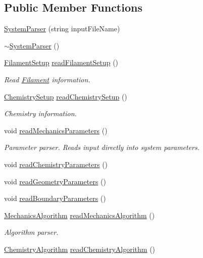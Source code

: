 \subsection*{Public Member Functions}
\begin{DoxyCompactItemize}
\item 
\hyperlink{classSystemParser_a47fe3046a8f228b77f06e84c56cccb39}{System\+Parser} (string input\+File\+Name)
\item 
\hyperlink{classSystemParser_a4603ce762d5b206694d97bb6c38f83ea}{$\sim$\+System\+Parser} ()
\item 
\hyperlink{structFilamentSetup}{Filament\+Setup} \hyperlink{classSystemParser_a2dac7ad3e016ee4ce9b93660c5192b2b}{read\+Filament\+Setup} ()
\begin{DoxyCompactList}\small\item\em Read \hyperlink{classFilament}{Filament} information. \end{DoxyCompactList}\item 
\hyperlink{structChemistrySetup}{Chemistry\+Setup} \hyperlink{classSystemParser_a8d3ff2c2163a7d141e751530c29181c8}{read\+Chemistry\+Setup} ()
\begin{DoxyCompactList}\small\item\em Chemistry information. \end{DoxyCompactList}\end{DoxyCompactItemize}
{\bf }\par
\begin{DoxyCompactItemize}
\item 
void \hyperlink{classSystemParser_a746e657d409e3dd3b40b08558a072932}{read\+Mechanics\+Parameters} ()
\begin{DoxyCompactList}\small\item\em Parameter parser. Reads input directly into system parameters. \end{DoxyCompactList}\item 
void \hyperlink{classSystemParser_a9170d246867cd58d69121ca6907baaf5}{read\+Chemistry\+Parameters} ()
\item 
void \hyperlink{classSystemParser_add4252ac4e2c4f2864a02ee13c45ad46}{read\+Geometry\+Parameters} ()
\item 
void \hyperlink{classSystemParser_a2a198730cbe281f0db40e1ddb529e878}{read\+Boundary\+Parameters} ()
\end{DoxyCompactItemize}

{\bf }\par
\begin{DoxyCompactItemize}
\item 
\hyperlink{structMechanicsAlgorithm}{Mechanics\+Algorithm} \hyperlink{classSystemParser_a93017271d75297c49a49e08871fa29e9}{read\+Mechanics\+Algorithm} ()
\begin{DoxyCompactList}\small\item\em Algorithm parser. \end{DoxyCompactList}\item 
\hyperlink{structChemistryAlgorithm}{Chemistry\+Algorithm} \hyperlink{classSystemParser_aa4dc61cfb269e17ae8adcfe58a2d41de}{read\+Chemistry\+Algorithm} ()
\end{DoxyCompactItemize}

